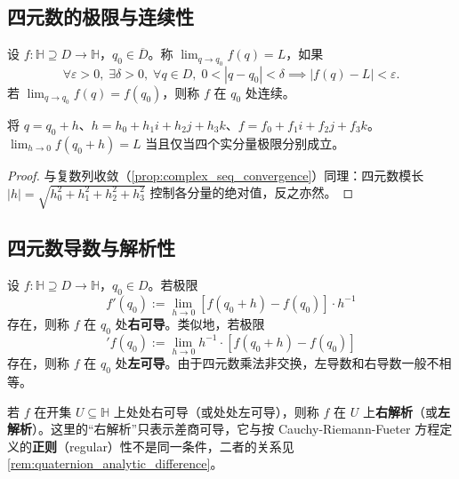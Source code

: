 \subsection{四元数的极限与连续性}

\begin{definition}[四元数极限]\label{def:quaternion_limit}
设 $f: \mathbb{H} \supseteq D \to \mathbb{H}$，$q_0 \in \overline{D}$。称 $\lim_{q\to q_0} f(q) = L$，如果
\[
\forall \varepsilon > 0,\; \exists \delta > 0,\; \forall q \in D,\; 0 < |q - q_0| < \delta \implies |f(q) - L| < \varepsilon.
\]
若 $\lim_{q \to q_0} f(q) = f(q_0)$，则称 $f$ 在 $q_0$ 处连续。
\end{definition}

\begin{proposition}[四元数极限的坐标刻画]\label{prop:quaternion_limit_coordinate}
将 $q = q_0 + h$、$h = h_0 + h_1 i + h_2 j + h_3 k$、$f = f_0 + f_1 i + f_2 j + f_3 k$。$\lim_{h \to 0} f(q_0 + h) = L$ 当且仅当四个实分量极限分别成立。
\end{proposition}

\begin{proof}
与复数列收敛（\cref{prop:complex_seq_convergence}）同理：四元数模长 $|h| = \sqrt{h_0^2 + h_1^2 + h_2^2 + h_3^2}$ 控制各分量的绝对值，反之亦然。
\end{proof}

\subsection{四元数导数与解析性}

\begin{definition}[四元数导数]\label{def:quaternion_derivative}
设 $f: \mathbb{H} \supseteq D \to \mathbb{H}$，$q_0 \in D$。若极限
\[
f'(q_0) := \lim_{h \to 0} [f(q_0 + h) - f(q_0)] \cdot h^{-1}
\]
存在，则称 $f$ 在 $q_0$ 处\textbf{右可导}。类似地，若极限
\[
{}'f(q_0) := \lim_{h \to 0} h^{-1} \cdot [f(q_0 + h) - f(q_0)]
\]
存在，则称 $f$ 在 $q_0$ 处\textbf{左可导}。由于四元数乘法非交换，左导数和右导数一般不相等。
\end{definition}

\begin{definition}[四元数解析函数]\label{def:quaternion_analytic}
若 $f$ 在开集 $U \subseteq \mathbb{H}$ 上处处右可导（或处处左可导），则称 $f$ 在 $U$ 上\textbf{右解析}（或\textbf{左解析}）。这里的“右解析”只表示差商可导，它与按 Cauchy-Riemann-Fueter 方程定义的\textbf{正则}（regular）性不是同一条件，二者的关系见 \cref{rem:quaternion_analytic_difference}。
\end{definition}

